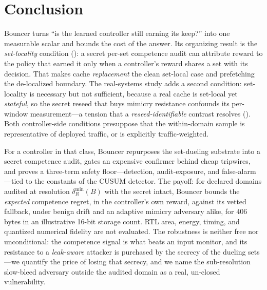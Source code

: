 \documentclass{article}
\begin{document}
\section{Conclusion}
Bouncer turns ``is the learned controller still earning its keep?'' into one
measurable scalar and bounds the cost of the answer. Its organizing result is the
\emph{set-locality} condition (): a secret per-set competence
audit can attribute reward to the policy that earned it only when a controller's
reward shares a set with its decision. That makes cache \emph{replacement} the
clean set-local case and prefetching the de-localized boundary. The real-systems
study adds a second condition: set-locality is necessary but not sufficient,
because a real cache is set-local yet \emph{stateful}, so the secret reseed that
buys mimicry resistance confounds its per-window measurement---a tension that a
\emph{reseed-identifiable} contrast resolves ().
Both controller-side conditions presuppose that the within-domain sample is
representative of deployed traffic, or is explicitly traffic-weighted.

For a controller in that class, Bouncer repurposes the set-dueling substrate into
a secret competence audit, gates an expensive confirmer behind cheap tripwires,
and proves a three-term safety floor---detection, audit-exposure, and
false-alarm---tied to the constants of the CUSUM detector. The payoff: for
declared domains audited at resolution $\delta_R^{\min}(B)$ with the secret intact,
Bouncer bounds the \emph{expected} competence regret, in the controller's own reward, against its
vetted fallback, under benign drift and an adaptive mimicry adversary alike, for
$406$ bytes in an illustrative 16-bit storage count. RTL area, energy, timing,
and quantized numerical fidelity are not evaluated. The robustness is
neither free nor unconditional: the competence signal is what beats an input monitor, and its
resistance to a \emph{leak-aware} attacker is purchased by the secrecy of the dueling sets---we
quantify the price of losing that secrecy, and we name the sub-resolution slow-bleed adversary
outside the audited domain as a real, un-closed vulnerability.
\end{document}
